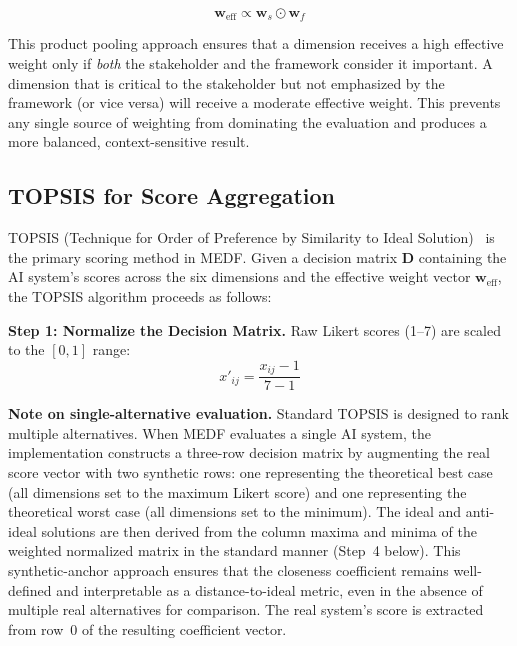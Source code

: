 \begin{equation}
  \mathbf{w}_{\mathrm{eff}} \propto \mathbf{w}_s \odot \mathbf{w}_f
  \label{eq:effective_weights}
\end{equation}

This product pooling approach ensures that a dimension receives a high effective weight only if \textit{both} the stakeholder and the framework consider it important. A dimension that is critical to the stakeholder but not emphasized by the framework (or vice versa) will receive a moderate effective weight. This prevents any single source of weighting from dominating the evaluation and produces a more balanced, context-sensitive result.

\subsection{TOPSIS for Score Aggregation}
\label{sec:topsis_algo}

TOPSIS (Technique for Order of Preference by Similarity to Ideal Solution)~\cite{hwang1981mcdm,behzadian2012topsis} is the primary scoring method in MEDF. Given a decision matrix $\mathbf{D}$ containing the AI system's scores across the six dimensions and the effective weight vector $\mathbf{w}_{\mathrm{eff}}$, the TOPSIS algorithm proceeds as follows:

\textbf{Step 1: Normalize the Decision Matrix.} Raw Likert scores (1--7) are scaled to the $[0, 1]$ range:
\begin{equation}
  x'_{ij} = \frac{x_{ij} - 1}{7 - 1}
  \label{eq:normalize}
\end{equation}

\noindent\textbf{Note on single-alternative evaluation.} Standard TOPSIS is designed to rank multiple alternatives. When MEDF evaluates a single AI system, the implementation constructs a three-row decision matrix by augmenting the real score vector with two synthetic rows: one representing the theoretical best case (all dimensions set to the maximum Likert score) and one representing the theoretical worst case (all dimensions set to the minimum). The ideal and anti-ideal solutions are then derived from the column maxima and minima of the weighted normalized matrix in the standard manner (Step~4 below). This synthetic-anchor approach ensures that the closeness coefficient remains well-defined and interpretable as a distance-to-ideal metric, even in the absence of multiple real alternatives for comparison. The real system's score is extracted from row~0 of the resulting coefficient vector.

